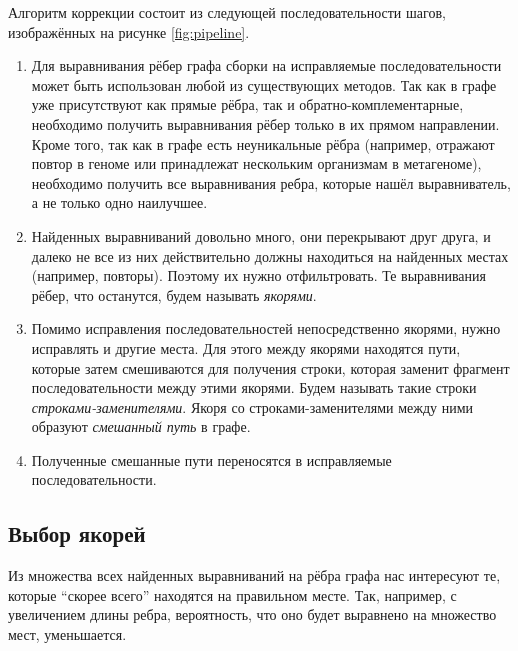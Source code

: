 \documentclass[14pt]{matmex-diploma-custom}
\begin{document}
Алгоритм коррекции состоит из следующей последовательности шагов, изображённых на рисунке \ref{fig:pipeline}.
\begin{enumerate}
    \item Для выравнивания рёбер графа сборки на исправляемые последовательности может быть использован любой из существующих методов. Так как в графе уже присутствуют как прямые рёбра, так и обратно-комплементарные, необходимо получить выравнивания рёбер только в их прямом направлении. Кроме того, так как в графе есть неуникальные рёбра (например, отражают повтор в геноме или принадлежат нескольким организмам в метагеноме), необходимо получить все выравнивания ребра, которые нашёл выравниватель, а не только одно наилучшее.
    \item Найденных выравниваний довольно много, они перекрывают друг друга, и далеко не все из них действительно должны находиться на найденных местах (например, повторы). Поэтому их нужно отфильтровать. Те выравнивания рёбер, что останутся, будем называть \textit{якорями}.
    \item Помимо исправления последовательностей непосредственно якорями, нужно исправлять и другие места. Для этого между якорями находятся пути, которые затем смешиваются для получения строки, которая заменит фрагмент последовательности между этими якорями. Будем называть такие строки \textit{строками-заменителями}. Якоря со строками-заменителями между ними образуют \textit{смешанный путь} в графе.
    \item Полученные смешанные пути переносятся в исправляемые последовательности.
\end{enumerate}

\subsection{Выбор якорей}
Из множества всех найденных выравниваний на рёбра графа нас интересуют те, которые ``скорее всего'' находятся на правильном месте. Так, например, с увеличением длины ребра, вероятность, что оно будет выравнено на множество мест, уменьшается.
\end{document}

